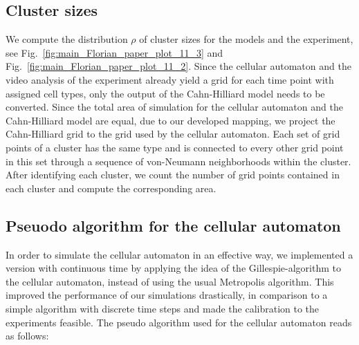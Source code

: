\documentclass[10pt,letterpaper]{article}
\newcommand{\figref}[1]{Fig.~\ref{fig:#1}}
\begin{document}
\subsection*{Cluster sizes}
We compute the distribution $\rho$ of cluster sizes for the models and the
experiment, see \figref{main_Florian_paper_plot_11_3} and
\figref{main_Florian_paper_plot_11_2}. Since the cellular automaton
and the video analysis of the experiment already yield a grid for each
time point with assigned cell types, only the output of the
Cahn-Hilliard model needs to be converted. Since the total area of
simulation for the cellular automaton and the Cahn-Hilliard model are
equal, due to our developed mapping, we project the Cahn-Hilliard grid
to the grid used by the cellular automaton. Each set of grid points of a
cluster has the same type and is connected to every other grid point in this set
through a sequence of von-Neumann neighborhoods within the cluster.
After identifying each cluster, we count the number of grid points
contained in each cluster and compute the corresponding area.

\subsection*{Pseuodo algorithm for the cellular automaton}

In order to simulate the cellular automaton in an effective way, we
implemented a version with continuous time by applying the idea of the
Gillespie-algorithm to the cellular automaton, instead of using the
usual Metropolis algorithm. This improved the performance of our
simulations drastically, in comparison to a simple algorithm with
discrete time steps and made the calibration to the experiments
feasible. The pseudo algorithm used for the cellular automaton reads
as follows:
\end{document}
